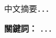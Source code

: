 \renewcommand{\thesisabstracthead}{摘要}
\renewcommand{\thesistitle}{\thesistitlechinese}
\begin{thesisabstract}
  
  中文摘要．．．


  \vspace{\baselineskip}
  \noindent
  \textbf{關鍵詞：} ．．．



\end{thesisabstract}

